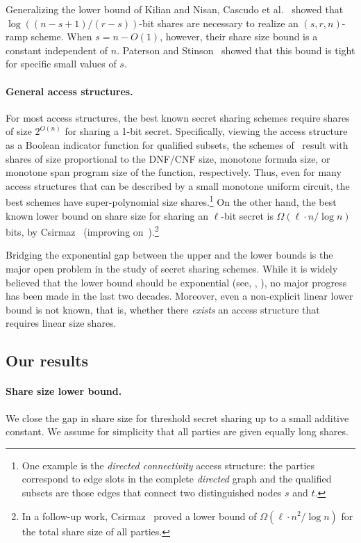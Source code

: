 \documentclass{toc}
\begin{document}
Generalizing the lower bound of Kilian and Nisan, Cascudo et al.~\cite{PueyoCX13} 
showed that $\log((n-s+1)/(r-s))$-bit shares are necessary to realize an
$(s,r,n)$-ramp scheme.   When $s = n - O(1)$, however, their share size bound
is a constant independent of $n$. Paterson and Stinson~\cite{PatersonS13} showed that this bound is tight for specific small values of $s$.

\paragraph{General access structures.}
For most access structures, the best known secret sharing schemes require shares
of size $2^{O(n)}$ for sharing a 1-bit secret. Specifically, viewing the access
structure as a Boolean indicator function for qualified subsets, the schemes of~\cite{ISN93,Leichter88,KarchmerW93} result with shares of size proportional to
the DNF/CNF size, monotone formula size, or monotone span program size of the
function, respectively. Thus, even for many access structures that can be
described by a small monotone uniform circuit, the best schemes have super-polynomial size shares.\footnote{One example is the \emph{directed
connectivity} access structure: the parties correspond to edge slots in the
complete \emph{directed} graph and the qualified subsets are those edges that
connect two distinguished nodes $s$ and $t$.}  On the other hand, the best
known lower bound on share size for sharing an $\ell$-bit secret is 
$\Omega(\ell\cdot n/\log{n})$ bits, by Csirmaz~\cite{Csirmaz97} (improving 
on~\cite{CapocelliSGV93}).\footnote{In a follow-up work,
Csirmaz~\cite{csirmaz1996dealer}  proved a lower bound of 
$\Omega(\ell\cdot n^2/ \log n)$ for the total share size of all parties.}

Bridging the exponential gap between
%
the upper and the lower bounds  %
is the major open
%
problem  %
in the study of secret sharing schemes. While it is widely believed
that the lower bound should be exponential 
(see, \eg, \cite{BeimelPHD,Beimel11}), no major progress has been
%
made  %
in the last two decades. Moreover, even a 
non-explicit linear lower bound is not known, that is, whether there
\emph{exists} an access structure that requires linear size shares.

\subsection{Our results}

\paragraph{Share size lower bound.} We close the gap in share size for threshold
secret sharing up to a small additive constant.  We assume for simplicity that
all parties are given equally long shares.
\end{document}
